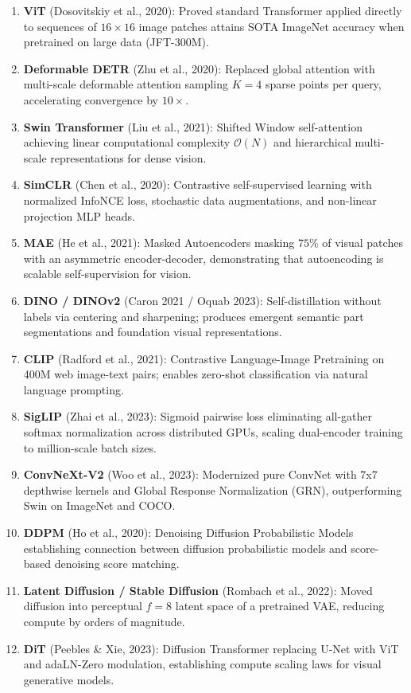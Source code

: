 \begin{enumerate}[leftmargin=*,itemsep=0.5pt,topsep=1pt]
\item \textbf{ViT} (Dosovitskiy et al., 2020): Proved standard Transformer applied directly to sequences of $16\times 16$ image patches attains SOTA ImageNet accuracy when pretrained on large data (JFT-300M).
\item \textbf{Deformable DETR} (Zhu et al., 2020): Replaced global attention with multi-scale deformable attention sampling $K=4$ sparse points per query, accelerating convergence by $10\times$.
\item \textbf{Swin Transformer} (Liu et al., 2021): Shifted Window self-attention achieving linear computational complexity $\mathcal{O}(N)$ and hierarchical multi-scale representations for dense vision.
\item \textbf{SimCLR} (Chen et al., 2020): Contrastive self-supervised learning with normalized InfoNCE loss, stochastic data augmentations, and non-linear projection MLP heads.
\item \textbf{MAE} (He et al., 2021): Masked Autoencoders masking $75\%$ of visual patches with an asymmetric encoder-decoder, demonstrating that autoencoding is scalable self-supervision for vision.
\item \textbf{DINO / DINOv2} (Caron 2021 / Oquab 2023): Self-distillation without labels via centering and sharpening; produces emergent semantic part segmentations and foundation visual representations.
\item \textbf{CLIP} (Radford et al., 2021): Contrastive Language-Image Pretraining on 400M web image-text pairs; enables zero-shot classification via natural language prompting.
\item \textbf{SigLIP} (Zhai et al., 2023): Sigmoid pairwise loss eliminating all-gather softmax normalization across distributed GPUs, scaling dual-encoder training to million-scale batch sizes.
\item \textbf{ConvNeXt-V2} (Woo et al., 2023): Modernized pure ConvNet with 7x7 depthwise kernels and Global Response Normalization (GRN), outperforming Swin on ImageNet and COCO.
\item \textbf{DDPM} (Ho et al., 2020): Denoising Diffusion Probabilistic Models establishing connection between diffusion probabilistic models and score-based denoising score matching.
\item \textbf{Latent Diffusion / Stable Diffusion} (Rombach et al., 2022): Moved diffusion into perceptual $f=8$ latent space of a pretrained VAE, reducing compute by orders of magnitude.
\item \textbf{DiT} (Peebles \& Xie, 2023): Diffusion Transformer replacing U-Net with ViT and adaLN-Zero modulation, establishing compute scaling laws for visual generative models.

\end{enumerate}
